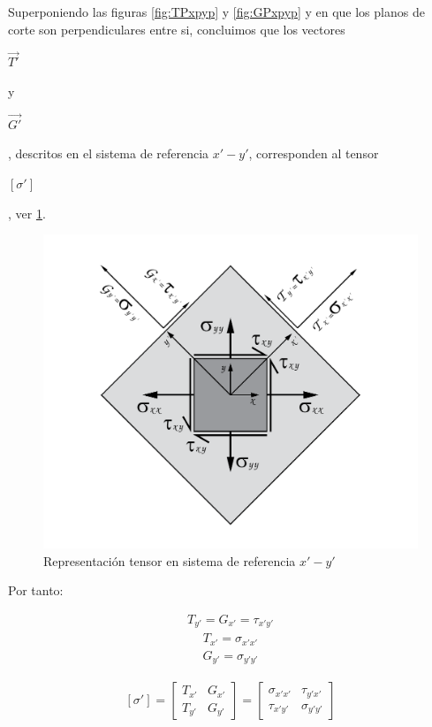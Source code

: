 \documentclass[12pt,letterpaper, twoside, openany]{article}
\begin{document}
Superponiendo las figuras \ref{fig:TPxpyp} y \ref{fig:GPxpyp} y en que los  planos de corte son perpendiculares entre si, concluimos que los vectores \begin{large} $\overset{\rightarrow}{T'}$\end{large} y \begin{large} $\overset{\rightarrow}{G'}$\end{large}, descritos en el sistema de referencia $x'-y'$, corresponden al tensor \begin{large} $\left[ \sigma' \right]$\end{large}, ver \cref{fig:equiv2D}.
%
\begin{figure}[H]
	\centering
		\includegraphics[width=12 cm]{img/Equivalencia.pdf}
		\caption{Representación tensor en sistema de referencia $x'-y'$}
		\label{fig:equiv2D}
\end{figure}
%
Por tanto:
%
\begin{large}
	\begin{align}
		T_{y'} = G_{x'}=\tau_{x'y'}
	\end{align}
	\begin{align}
		T_{x'}=\sigma_{x'x'}
	\end{align}
	\begin{align}
		G_{y'}=\sigma_{y'y'}
	\end{align}
\end{large}
%
\begin{large}
	\begin{align}
		\left[\sigma'\right]=
		\left[ \begin{array}{cc}
		T_{x'} & G_{x'} \\  
		T_{y'} & G_{y'}
		\end{array}  \right] =
		\left[ \begin{array}{cc}
		\sigma_{x'x'} & \tau_{y'x'} \\  
		\tau_{x'y'} & \sigma_{y'y'}
		\end{array}  \right]
		\label{eq:equiv}
	\end{align}
\end{large}
\end{document}

